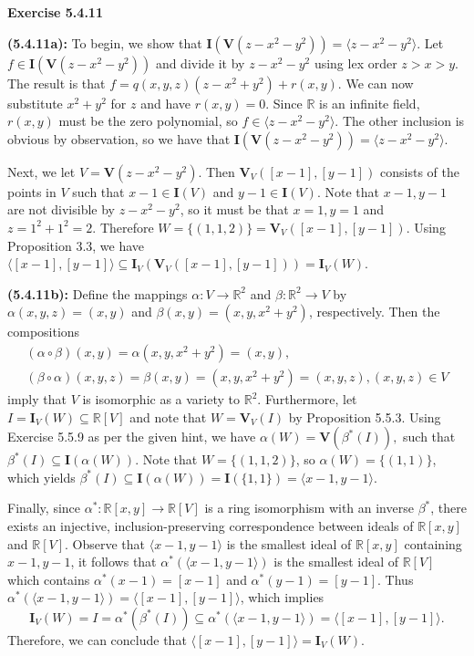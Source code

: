 \documentclass[12pt,oneside]{article}
\newenvironment{exercise}[1]{\vspace{.1in}\noindent\textbf{Exercise #1 \hspace{.05em}}}{}
\newcommand{\R}{\mathbb{R}}
\begin{document}

\begin{exercise}{5.4.11}
    
    \bigskip
    \textbf{(5.4.11a):}
    To begin, we show that 
    $\mathbf{I}(\mathbf{V}(z-x^2-y^2)) = \langle z-x^2-y^2 \rangle$. 
    Let $f \in \mathbf{I}(\mathbf{V}(z-x^2-y^2))$ and divide it by 
    $z-x^2-y^2$ using lex order $z>x>y$. The result is that 
    $f=q(x,y,z)(z-x^2+y^2)+r(x,y)$. We can now substitute $x^2+y^2$ 
    for $z$ and have $r(x,y) = 0$. Since $\R$ is an infinite field, 
    $r(x,y)$ must be the zero polynomial, so $f \in \langle z-x^2-y^2 \rangle$.
    The other inclusion is obvious by observation, so we have that 
    $\mathbf{I}(\mathbf{V}(z-x^2-y^2))=\langle z-x^2-y^2\rangle$.

    Next, we let $V=\mathbf{V}(z-x^2-y^2)$. Then $\mathbf{V}_V([x-1],[y-1])$ 
    consists of the points in $V$ such that $x-1 \in \mathbf{I}(V)$ 
    and $y-1 \in \mathbf{I}(V)$. Note that $x-1,y-1$ are not divisible 
    by $z-x^2-y^2$, so it must be that $x=1,y=1$ and $z=1^2+1^2=2$. 
    Therefore $W=\{(1,1,2)\} = \mathbf{V}_V([x-1],[y-1])$. Using 
    Proposition 3.3, we have $\langle [x-1],[y-1] \rangle \subseteq \mathbf{I}_V(\mathbf{V}_V([x-1],[y-1]))=\mathbf{I}_V(W)$.
    
    \bigskip
    \textbf{(5.4.11b):}
    Define the mappings $\alpha:V\to \R^2$ and $\beta:\R^2\to V$ by 
    $\alpha(x,y,z)=(x,y)$ and $\beta(x,y)=(x,y,x^2+y^2)$, respectively.
    Then the compositions
    \begin{align*}
        (\alpha \circ \beta)(x,y) = \alpha(x,y,x^2+y^2)=(x,y),\\
        (\beta \circ \alpha)(x,y,z) = \beta(x,y)=(x,y,x^2+y^2)=(x,y,z), (x,y,z) \in V
    \end{align*}
    imply that $V$ is isomorphic as a variety to $\R^2$. Furthermore, 
    let $I=\mathbf{I}_V(W)\subseteq \R[V]$ and note that $W = \mathbf{V}_V(I)$
    by Proposition 5.5.3. Using Exercise 5.5.9 as per the given hint,
    we have $\alpha(W) = \mathbf{V}(\beta^*(I)),$ such that 
    $\beta^*(I) \subseteq \mathbf{I}(\alpha(W))$. Note that 
    $W=\{(1,1,2)\}$, so $\alpha(W) = \{(1,1)\}$, which yields 
    $\beta^*(I) \subseteq \mathbf{I}(\alpha(W))=\mathbf{I}(\{1,1\})=\langle x-1, y-1 \rangle$.

    Finally, since $\alpha^*:\R[x,y]\to\R[V]$ is a ring isomorphism 
    with an inverse $\beta^*$, there exists an injective, inclusion-preserving 
    correspondence between ideals of $\R[x,y]$ and $\R[V]$. Observe 
    that $\langle x-1, y-1 \rangle$ is the smallest ideal of 
    $\R[x,y]$ containing $x-1,y-1$, it follows that $\alpha^*(\langle x-1,y-1\rangle)$ 
    is the smallest ideal of $\R[V]$ which contains $\alpha^*(x-1)=[x-1]$ and 
    $\alpha^*(y-1)=[y-1].$ Thus $\alpha^*(\langle x-1,y-1\rangle)= \langle[x-1],[y-1]\rangle$,
    which implies 
    \[
        \mathbf{I}_V(W)=I=\alpha^*(\beta^*(I))\subseteq \alpha^*(\langle x-1, y-1\rangle)=\langle[x-1],[y-1]\rangle.    
    \]
    Therefore, we can conclude that $\langle[x-1],[y-1] \rangle=\mathbf{I}_V(W)$.

\end{exercise}


\end{document}
